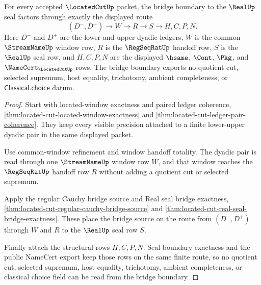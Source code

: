 \begin{theorem}
\label{thm:located-cut-bridge-boundary-package}
For every accepted $\LocatedCutUp$ packet, the bridge boundary to the $\RealUp$ seal factors through exactly the displayed route
$$
(D^{-},D^{+}) \longrightarrow W \longrightarrow R \longrightarrow S \longrightarrow H,C,P,N .
$$
Here $D^{-}$ and $D^{+}$ are the lower and upper dyadic ledgers, $W$ is the common $\StreamNameUp$ window row, $R$ is the $\RegSeqRatUp$ handoff row, $S$ is the $\RealUp$ seal row, and $H,C,P,N$ are the displayed $\hsame$, $\Cont$, $\Pkg$, and $\NameCert_{\LocatedCutUp}$ rows. The bridge boundary exports no quotient cut, selected supremum, host equality, trichotomy, ambient completeness, or $\mathsf{Classical.choice}$ datum.
\end{theorem}
\begin{proof}
Start with located-window exactness and paired ledger coherence, \autoref{thm:located-cut-located-window-exactness} and \autoref{thm:located-cut-ledger-pair-coherence}. They keep every visible precision attached to a finite lower-upper dyadic pair in the same displayed packet.

Use common-window refinement and window handoff totality. The dyadic pair is read through one $\StreamNameUp$ window row $W$, and that window reaches the $\RegSeqRatUp$ handoff row $R$ without adding a quotient cut or selected supremum.

Apply the regular Cauchy bridge source and Real seal bridge exactness, \autoref{thm:located-cut-regular-cauchy-bridge-source} and \autoref{thm:located-cut-real-seal-bridge-exactness}. These place the bridge source on the route from $(D^{-},D^{+})$ through $W$ and $R$ to the $\RealUp$ seal row $S$.

Finally attach the structural rows $H,C,P,N$. Seal-boundary exactness and the public NameCert export keep those rows on the same finite route, so no quotient cut, selected supremum, host equality, trichotomy, ambient completeness, or classical choice field can be read from the bridge boundary.
\end{proof}


